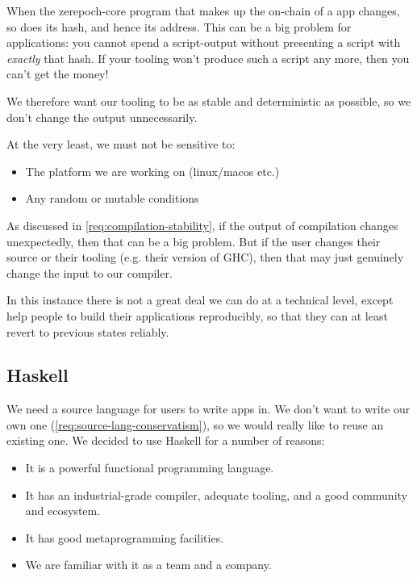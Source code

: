 \begin{requirement}[Stability]
\label{req:compilation-stability}
When the \gls{zerepoch-core} program that makes up the \gls{on-chain} of a \gls{app} changes, so does its hash, and hence its \gls{address}.
This can be a big problem for applications: you cannot spend a \gls{script-output} without presenting a \gls{script} with \emph{exactly} that hash.
If your tooling won't produce such a \gls{script} any more, then you can't get the money!

We therefore want our tooling to be as stable and deterministic as possible, so we don't change the output unnecessarily.

At the very least, we must not be sensitive to:
\begin{itemize}
\item The platform we are working on (linux/macos etc.)
\item Any random or mutable conditions
\end{itemize}
\end{requirement}

\begin{requirement}
\label{req:compilation-reproducibility}
As discussed in \cref{req:compilation-stability}, if the output of compilation changes unexpectedly, then that can be a big problem.
But if the user changes their source or their tooling (e.g. their version of GHC), then that may just genuinely change the input to our compiler.

In this instance there is not a great deal we can do at a technical level, except help people to build their applications reproducibly, so that
they can at least revert to previous states reliably.
\end{requirement}

\subsection{Haskell}

We need a source language for users to write \glspl{app} in.
We don't want to write our own one (\cref{req:source-lang-conservatism}), so we would really like to reuse an existing one.
We decided to use Haskell for a number of reasons:
\begin{itemize}
\item
  It is a powerful functional programming language.
\item
  It has an industrial-grade compiler, adequate tooling, and a good community and ecosystem.
\item
  It has good metaprogramming facilities.
\item
  We are familiar with it as a team and a company.
\end{itemize}

